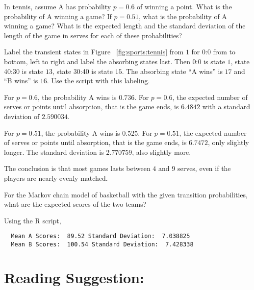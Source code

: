 \documentclass[12pt]{article}
\begin{document}
\begin{exercise}
    In tennis, assume A has probability \( p = 0.6 \) of winning a
    point.  What is the probability of A winning a game?  If \( p = 0.51
    \), what is the probability of A winning a game?  What is the
    expected length and the standard deviation of the length of the game
    in serves for each of these probabilities?
\end{exercise}
\begin{solution}
    Label the transient states in Figure~%
    \ref{fig:sports:tennis} from \( 1 \) for 0:0 from to bottom, left to
    right and label the absorbing states last.  Then 0:0 is state \( 1 \),
    state 40:30 is state \( 13 \), state 30:40 is state \( 15 \).  The
    absorbing state ``A wins'' is \( 17 \) and ``B wins'' is \( 16 \).
    Use the script with this labeling.

    For \( p = 0.6 \), the probability A wins is \( 0.736 \).  For \( p
    = 0.6 \), the expected number of serves or points until absorption,
    that is the game ends, is \( 6.4842 \) with a standard deviation of \(
    2.590034 \).

    For \( p = 0.51 \), the probability A wins is \( 0.525 \).  For \( p
    = 0.51 \), the expected number of serves or points until absorption,
    that is the game ends, is \( 6.7472 \), only slightly longer.  The
    standard deviation is \( 2.770759 \), also slightly more.

    The conclusion is that most games lasts between \( 4 \) and \( 9 \)
    serves, even if the players are nearly evenly matched.

\end{solution}
\begin{exercise}
    For the Markov chain model of basketball with the given transition
    probabilities, what are the expected scores of the two teams?
\end{exercise}
\begin{solution}
    Using the R script,
\begin{verbatim}
  Mean A Scores:  89.52 Standard Deviation:  7.038825 
  Mean B Scores:  100.54 Standard Deviation:  7.428338 
\end{verbatim}
\end{solution}

\hr

\section*{Reading Suggestion:}
\end{document}
